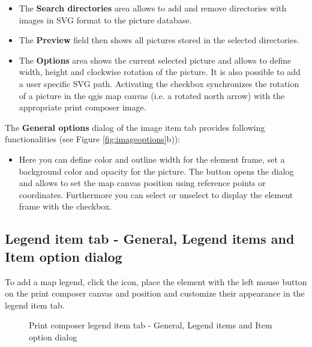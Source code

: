 \begin{itemize}[label=--]
\item The \textbf{Search directories} area allows to add and remove
directories with images in SVG format to the picture database.
\item The \textbf{Preview} field then shows all pictures stored in the
selected directories.
\item The \textbf{Options} area shows the current selected picture and allows
to define width, height and clockwise rotation of the picture. It is also possible
to add a user specific SVG path. Activating the
 checkbox synchronizes the rotation of a picture in
the qgis map canvas (i.e. a rotated north arrow) with the appropriate print
composer image.
\end{itemize}


The \textbf{General options} dialog of the image item tab provides following
functionalities (see Figure \ref{fig:imageoptions}b)):

\begin{itemize}[label=--]
\item Here you can define color and outline width for the element frame, set
a background color and opacity for the picture. The 
button opens the  dialog and allows to set the map
canvas position using reference points or coordinates. Furthermore you can
select or unselect to display the element frame with the  checkbox.
\end{itemize}

\subsection{Legend item tab - General, Legend items and Item option dialog }

To add a map legend, click the 
icon, place the element with the left mouse button on the print composer
canvas and position and customize their appearance in the legend item tab.

\begin{figure}[h]
\centering
   \hspace{1cm}
   \hspace{1cm}
   \caption{Print composer legend item tab - General, Legend items and Item option dialog\nixcaption}\label{fig:legendoptions}
\end{figure}

